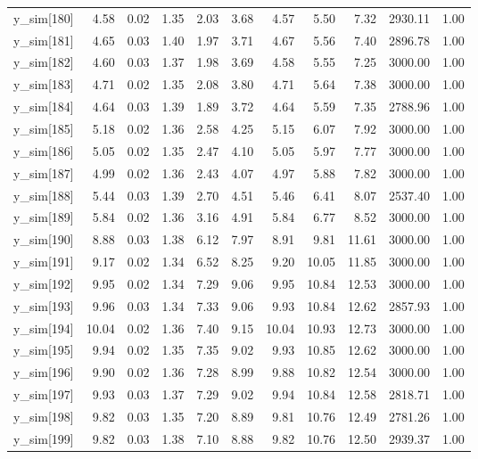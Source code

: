 \begin{table}[ht]
\begin{tabular}{rrrrrrrrrrr}
  y\_sim[180] & 4.58 & 0.02 & 1.35 & 2.03 & 3.68 & 4.57 & 5.50 & 7.32 & 2930.11 & 1.00 \\ 
  y\_sim[181] & 4.65 & 0.03 & 1.40 & 1.97 & 3.71 & 4.67 & 5.56 & 7.40 & 2896.78 & 1.00 \\ 
  y\_sim[182] & 4.60 & 0.03 & 1.37 & 1.98 & 3.69 & 4.58 & 5.55 & 7.25 & 3000.00 & 1.00 \\ 
  y\_sim[183] & 4.71 & 0.02 & 1.35 & 2.08 & 3.80 & 4.71 & 5.64 & 7.38 & 3000.00 & 1.00 \\ 
  y\_sim[184] & 4.64 & 0.03 & 1.39 & 1.89 & 3.72 & 4.64 & 5.59 & 7.35 & 2788.96 & 1.00 \\ 
  y\_sim[185] & 5.18 & 0.02 & 1.36 & 2.58 & 4.25 & 5.15 & 6.07 & 7.92 & 3000.00 & 1.00 \\ 
  y\_sim[186] & 5.05 & 0.02 & 1.35 & 2.47 & 4.10 & 5.05 & 5.97 & 7.77 & 3000.00 & 1.00 \\ 
  y\_sim[187] & 4.99 & 0.02 & 1.36 & 2.43 & 4.07 & 4.97 & 5.88 & 7.82 & 3000.00 & 1.00 \\ 
  y\_sim[188] & 5.44 & 0.03 & 1.39 & 2.70 & 4.51 & 5.46 & 6.41 & 8.07 & 2537.40 & 1.00 \\ 
  y\_sim[189] & 5.84 & 0.02 & 1.36 & 3.16 & 4.91 & 5.84 & 6.77 & 8.52 & 3000.00 & 1.00 \\ 
  y\_sim[190] & 8.88 & 0.03 & 1.38 & 6.12 & 7.97 & 8.91 & 9.81 & 11.61 & 3000.00 & 1.00 \\ 
  y\_sim[191] & 9.17 & 0.02 & 1.34 & 6.52 & 8.25 & 9.20 & 10.05 & 11.85 & 3000.00 & 1.00 \\ 
  y\_sim[192] & 9.95 & 0.02 & 1.34 & 7.29 & 9.06 & 9.95 & 10.84 & 12.53 & 3000.00 & 1.00 \\ 
  y\_sim[193] & 9.96 & 0.03 & 1.34 & 7.33 & 9.06 & 9.93 & 10.84 & 12.62 & 2857.93 & 1.00 \\ 
  y\_sim[194] & 10.04 & 0.02 & 1.36 & 7.40 & 9.15 & 10.04 & 10.93 & 12.73 & 3000.00 & 1.00 \\ 
  y\_sim[195] & 9.94 & 0.02 & 1.35 & 7.35 & 9.02 & 9.93 & 10.85 & 12.62 & 3000.00 & 1.00 \\ 
  y\_sim[196] & 9.90 & 0.02 & 1.36 & 7.28 & 8.99 & 9.88 & 10.82 & 12.54 & 3000.00 & 1.00 \\ 
  y\_sim[197] & 9.93 & 0.03 & 1.37 & 7.29 & 9.02 & 9.94 & 10.84 & 12.58 & 2818.71 & 1.00 \\ 
  y\_sim[198] & 9.82 & 0.03 & 1.35 & 7.20 & 8.89 & 9.81 & 10.76 & 12.49 & 2781.26 & 1.00 \\ 
  y\_sim[199] & 9.82 & 0.03 & 1.38 & 7.10 & 8.88 & 9.82 & 10.76 & 12.50 & 2939.37 & 1.00 \\ 

\end{tabular}
\end{table}
